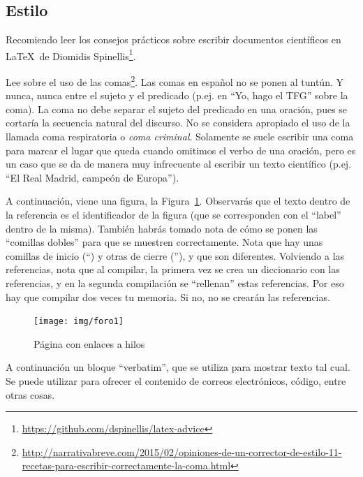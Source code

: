\documentclass[a4paper, 12pt]{book}
\begin{document}
	\subsection{Estilo}
	\label{subsec:estilo}
	
	Recomiendo leer los consejos prácticos sobre escribir documentos científicos en \LaTeX \ de Diomidis Spinellis\footnote{\url{https://github.com/dspinellis/latex-advice}}.
	
	Lee sobre el uso de las comas\footnote{\url{http://narrativabreve.com/2015/02/opiniones-de-un-corrector-de-estilo-11-recetas-para-escribir-correctamente-la-coma.html}}. 
	Las comas en español no se ponen al tuntún.
	Y nunca, nunca entre el sujeto y el predicado (p.ej. en ``Yo, hago el TFG'' sobre la coma).
	La coma no debe separar el sujeto del predicado en una oración, pues se cortaría la secuencia natural del discurso.
	No se considera apropiado el uso de la llamada coma respiratoria o \emph{coma criminal}.
	Solamente se suele escribir una coma para marcar el lugar que queda cuando omitimos el verbo de una oración, pero es un caso que se da de manera muy infrecuente al escribir un texto científico (p.ej. ``El Real Madrid, campeón de Europa'').
	
	A continuación, viene una figura, la Figura~\ref{figura:foro_hilos}. 
	Observarás que el texto dentro de la referencia es el identificador de la figura (que se corresponden con el ``label'' dentro de la misma). 
	También habrás tomado nota de cómo se ponen las ``comillas dobles'' para que se muestren correctamente. 
	Nota que hay unas comillas de inicio (``) y otras de cierre (''), y que son diferentes.
	Volviendo a las referencias, nota que al compilar, la primera vez se crea un diccionario con las referencias, y en la segunda compilación se ``rellenan'' estas referencias. 
	Por eso hay que compilar dos veces tu memoria.
	Si no, no se crearán las referencias.
	
	
	
	\begin{figure}
		\centering
		\texttt{[image: img/foro1]}
		\caption{Página con enlaces a hilos}
		\label{figura:foro_hilos}
	\end{figure}
	
	
	A continuación un bloque ``verbatim'', que se utiliza para mostrar texto tal cual.
	Se puede utilizar para ofrecer el contenido de correos electrónicos, código, entre otras cosas.
	
\end{document}
